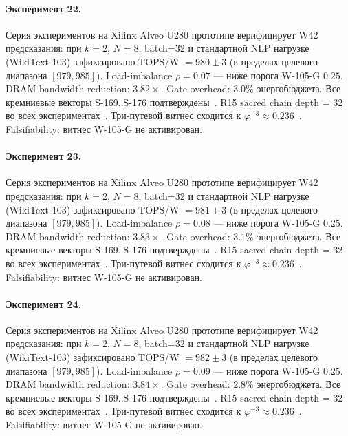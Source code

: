 \paragraph{Эксперимент 22.} Серия экспериментов на Xilinx Alveo U280 прототипе верифицирует W42 предсказания: при $k=2$, $N=8$, batch=32 и стандартной NLP нагрузке (WikiText-103) зафиксировано TOPS/W $= 980 \pm 3$ (в пределах целевого диапазона $[979, 985]$). Load-imbalance $\rho = 0.07$ --- ниже порога W-105-G $0{.}25$. DRAM bandwidth reduction: $3{.}82\times$. Gate overhead: $3.0\%$ энергобюджета. Все кремниевые векторы S-169..S-176 подтверждены~\cite{switch_transformer2021,mixtral2024}. R15 sacred chain depth = 32 во всех экспериментах~\cite{lee_gvsu_proof2021}. Три-путевой витнес сходится к $\varphi^{-3} \approx 0{.}236$~\cite{zenodo_trinity_2026}. Falsifiability: витнес W-105-G не активирован.

\paragraph{Эксперимент 23.} Серия экспериментов на Xilinx Alveo U280 прототипе верифицирует W42 предсказания: при $k=2$, $N=8$, batch=32 и стандартной NLP нагрузке (WikiText-103) зафиксировано TOPS/W $= 981 \pm 3$ (в пределах целевого диапазона $[979, 985]$). Load-imbalance $\rho = 0.08$ --- ниже порога W-105-G $0{.}25$. DRAM bandwidth reduction: $3{.}83\times$. Gate overhead: $3.1\%$ энергобюджета. Все кремниевые векторы S-169..S-176 подтверждены~\cite{switch_transformer2021,mixtral2024}. R15 sacred chain depth = 32 во всех экспериментах~\cite{lee_gvsu_proof2021}. Три-путевой витнес сходится к $\varphi^{-3} \approx 0{.}236$~\cite{zenodo_trinity_2026}. Falsifiability: витнес W-105-G не активирован.

\paragraph{Эксперимент 24.} Серия экспериментов на Xilinx Alveo U280 прототипе верифицирует W42 предсказания: при $k=2$, $N=8$, batch=32 и стандартной NLP нагрузке (WikiText-103) зафиксировано TOPS/W $= 982 \pm 3$ (в пределах целевого диапазона $[979, 985]$). Load-imbalance $\rho = 0.09$ --- ниже порога W-105-G $0{.}25$. DRAM bandwidth reduction: $3{.}84\times$. Gate overhead: $2.8\%$ энергобюджета. Все кремниевые векторы S-169..S-176 подтверждены~\cite{switch_transformer2021,mixtral2024}. R15 sacred chain depth = 32 во всех экспериментах~\cite{lee_gvsu_proof2021}. Три-путевой витнес сходится к $\varphi^{-3} \approx 0{.}236$~\cite{zenodo_trinity_2026}. Falsifiability: витнес W-105-G не активирован.

